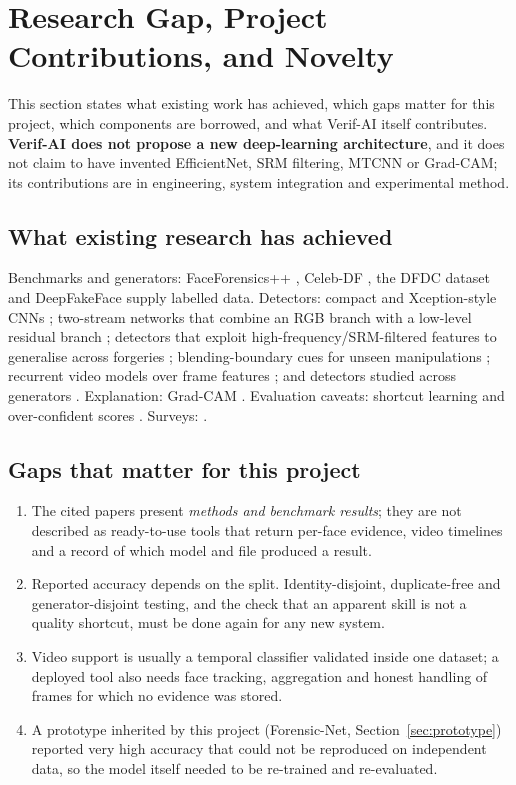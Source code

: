 
\section{Research Gap, Project Contributions, and Novelty}
\label{sec:novelty}
This section states what existing work has achieved, which gaps matter for this project, which components are borrowed, and what Verif-AI itself contributes. \textbf{Verif-AI does not propose a new deep-learning architecture}, and it does not claim to have invented EfficientNet, SRM filtering, MTCNN or Grad-CAM; its contributions are in engineering, system integration and experimental method.

\subsection{What existing research has achieved}
Benchmarks and generators: FaceForensics++ \citep{rossler2019ff}, Celeb-DF \citep{li2020celebdf}, the DFDC dataset \citep{dolhansky2020dfdc} and DeepFakeFace \citep{song2023dff} supply labelled data. Detectors: compact and Xception-style CNNs \citep{afchar2018mesonet,rossler2019ff}; two-stream networks that combine an RGB branch with a low-level residual branch \citep{zhou2017twostream}; detectors that exploit high-frequency/SRM-filtered features to generalise across forgeries \citep{luo2021highfreq}; blending-boundary cues for unseen manipulations \citep{li2020facexray}; recurrent video models over frame features \citep{guera2018rnn,masi2020twobranch}; and detectors studied across generators \citep{wang2020cnn,ojha2023universal,corvi2023diffusion}. Explanation: Grad-CAM \citep{selvaraju2017gradcam}. Evaluation caveats: shortcut learning \citep{geirhos2020shortcut} and over-confident scores \citep{guo2017calibration}. Surveys: \citep{verdoliva2020media,tolosana2020deepfakes}.

\subsection{Gaps that matter for this project}
\begin{enumerate}[label=G\arabic*.]
\item The cited papers present \emph{methods and benchmark results}; they are not described as ready-to-use tools that return per-face evidence, video timelines and a record of which model and file produced a result.
\item Reported accuracy depends on the split. Identity-disjoint, duplicate-free and generator-disjoint testing, and the check that an apparent skill is not a quality shortcut, must be done again for any new system.
\item Video support is usually a temporal classifier validated inside one dataset; a deployed tool also needs face tracking, aggregation and honest handling of frames for which no evidence was stored.
\item A prototype inherited by this project (Forensic-Net, Section~\ref{sec:prototype}) reported very high accuracy that could not be reproduced on independent data, so the model itself needed to be re-trained and re-evaluated.
\end{enumerate}

